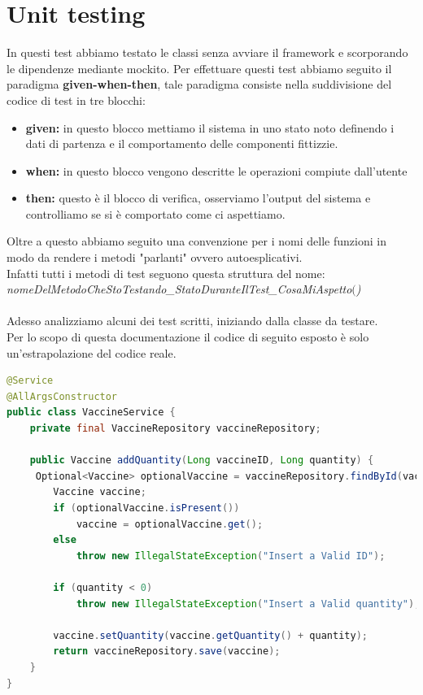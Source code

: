 \documentclass[a4paper,12pt,openany,oneside]{book}
\begin{document}
\section{Unit testing}
In questi test abbiamo testato le classi senza avviare il framework e scorporando le dipendenze mediante mockito. Per effettuare questi test abbiamo seguito il paradigma \textbf{given-when-then}, tale paradigma consiste nella suddivisione del codice di test in tre blocchi:
\begin{itemize}
  \item \textbf{given:} in questo blocco mettiamo il sistema in uno stato noto definendo i dati di partenza e il comportamento delle componenti fittizzie.
  \item \textbf{when:} in questo blocco vengono descritte le operazioni compiute dall'utente
    \item \textbf{then:} questo è il blocco di verifica, osserviamo l'output del sistema e controlliamo se si è comportato come ci aspettiamo.
\end{itemize}
Oltre a questo abbiamo seguito una convenzione per i nomi delle funzioni in modo da rendere i metodi "parlanti" ovvero autoesplicativi.\\
Infatti tutti i metodi di test seguono questa struttura del nome:\\
\textit{\color{red}nomeDelMetodoCheStoTestando\_StatoDuranteIlTest\_CosaMiAspetto\((\))}\\
\\Adesso analizziamo alcuni dei test scritti, iniziando dalla classe da testare.
\\Per lo scopo di questa documentazione il codice di seguito esposto è solo un'estrapolazione del codice reale.
\begin{lstlisting}[language=Java]
@Service
@AllArgsConstructor
public class VaccineService {
	private final VaccineRepository vaccineRepository;

	public Vaccine addQuantity(Long vaccineID, Long quantity) {
	 Optional<Vaccine> optionalVaccine = vaccineRepository.findById(vaccineID);
		Vaccine vaccine;
		if (optionalVaccine.isPresent())
			vaccine = optionalVaccine.get();
		else
			throw new IllegalStateException("Insert a Valid ID");

		if (quantity < 0)
			throw new IllegalStateException("Insert a Valid quantity");

		vaccine.setQuantity(vaccine.getQuantity() + quantity);
		return vaccineRepository.save(vaccine);
	}
}
\end{lstlisting}
\end{document}

